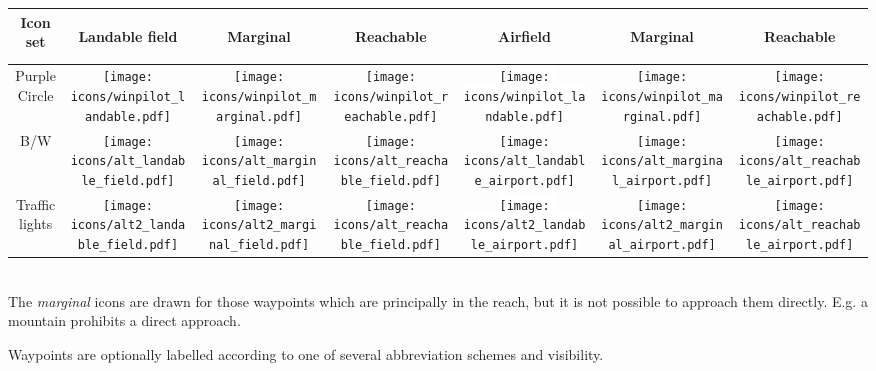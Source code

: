 \begin{tabular}{c|ccc|ccc|}
Icon set 
&\begin{sideways}Landable field\end{sideways}
&\begin{sideways}Marginal\end{sideways}
&\begin{sideways}Reachable\end{sideways}
&\begin{sideways}Airfield\end{sideways}
&\begin{sideways}Marginal\end{sideways}
&\begin{sideways}Reachable\end{sideways}\\
\hline
Purple Circle &
\texttt{[image: icons/winpilot\_landable.pdf]} &
\texttt{[image: icons/winpilot\_marginal.pdf]} &
\texttt{[image: icons/winpilot\_reachable.pdf]} &
\colorbox{white}{\texttt{[image: icons/winpilot\_landable.pdf]}} &
\texttt{[image: icons/winpilot\_marginal.pdf]} &
\texttt{[image: icons/winpilot\_reachable.pdf]} \\
\hline
B/W & 
\texttt{[image: icons/alt\_landable\_field.pdf]} &
\texttt{[image: icons/alt\_marginal\_field.pdf]} &
\texttt{[image: icons/alt\_reachable\_field.pdf]} &
\colorbox[rgb]{0.94,0.94,0.94}{\texttt{[image: icons/alt\_landable\_airport.pdf]}} &
\texttt{[image: icons/alt\_marginal\_airport.pdf]} &
\texttt{[image: icons/alt\_reachable\_airport.pdf]} \\
\hline
Traffic lights & 
\texttt{[image: icons/alt2\_landable\_field.pdf]} &
\texttt{[image: icons/alt2\_marginal\_field.pdf]} &
\texttt{[image: icons/alt\_reachable\_field.pdf]} &
\colorbox{white}{\texttt{[image: icons/alt2\_landable\_airport.pdf]}} &
\texttt{[image: icons/alt2\_marginal\_airport.pdf]} &
\texttt{[image: icons/alt\_reachable\_airport.pdf]} \\
\hline
\end{tabular} \\

The {\it marginal} icons are drawn for those waypoints which are principally in the 
reach, but it is not possible to approach them directly. E.g. a mountain prohibits a direct approach.
  
Waypoints are optionally labelled according to one of several
abbreviation schemes  and visibility.

